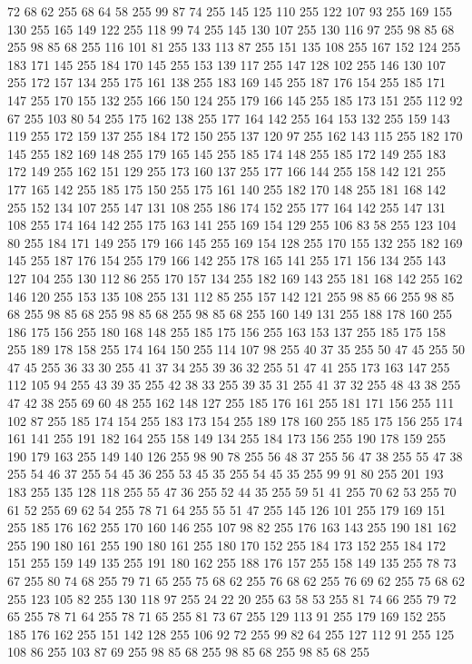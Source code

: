 72 68 62 255 68 64 58 255 99 87 74 255 145 125 110 255 122 107 93 255 169 155 130 255 165 149 122 255 118 99 74 255 145 130 107 255 130 116 97 255 98 85 68 255 98 85 68 255 116 101 81 255 133 113 87 255 151 135 108 255 167 152 124 255 183 171 145 255 184 170 145 255 153 139 117 255 147 128 102 255 146 130 107 255 172 157 134 255 175 161 138 255 183 169 145 255 187 176 154 255 185 171 147 255 170 155 132 255 166 150 124 255 179 166 145 255 185 173 151 255 112 92 67 255 103 80 54 255 175 162 138 255 177 164 142 255 164 153 132 255 159 143 119 255 172 159 137 255 184 172 150 255 137 120 97 255 162 143 115 255 182 170 145 255 182 169 148 255 179 165 145 255 185 174 148 255 185 172 149 255 183 172 149 255 162 151 129 255 173 160 137 255 177 166 144 255 158 142 121 255 177 165 142 255 185 175 150 255 175 161 140 255 182 170 148 255 181 168 142 255 152 134 107 255 147 131 108 255 186 174 152 255 177 164 142 255 147 131 108 255 174 164 142 255 175 163 141 255 169 154 129 255 106 83 58 255
123 104 80 255 184 171 149 255 179 166 145 255 169 154 128 255 170 155 132 255 182 169 145 255 187 176 154 255 179 166 142 255 178 165 141 255 171 156 134 255 143 127 104 255 130 112 86 255 170 157 134 255 182 169 143 255 181 168 142 255 162 146 120 255 153 135 108 255 131 112 85 255 157 142 121 255 98 85 66 255 98 85 68 255 98 85 68 255 98 85 68 255 98 85 68 255 160 149 131 255 188 178 160 255 186 175 156 255 180 168 148 255 185 175 156 255 163 153 137 255 185 175 158 255 189 178 158 255 174 164 150 255 114 107 98 255 40 37 35 255 50 47 45 255 50 47 45 255 36 33 30 255 41 37 34 255 39 36 32 255 51 47 41 255 173 163 147 255 112 105 94 255 43 39 35 255 42 38 33 255 39 35 31 255 41 37 32 255 48 43 38 255 47 42 38 255 69 60 48 255 162 148 127 255 185 176 161 255 181 171 156 255 111 102 87 255 185 174 154 255 183 173 154 255 189 178 160 255 185 175 156 255 174 161 141 255 191 182 164 255 158 149 134 255 184 173 156 255 190 178 159 255 190 179 163 255
149 140 126 255 98 90 78 255 56 48 37 255 56 47 38 255 55 47 38 255 54 46 37 255 54 45 36 255 53 45 35 255 54 45 35 255 99 91 80 255 201 193 183 255 135 128 118 255 55 47 36 255 52 44 35 255 59 51 41 255 70 62 53 255 70 61 52 255 69 62 54 255 78 71 64 255 55 51 47 255 145 126 101 255 179 169 151 255 185 176 162 255 170 160 146 255 107 98 82 255 176 163 143 255 190 181 162 255 190 180 161 255 190 180 161 255 180 170 152 255 184 173 152 255 184 172 151 255 159 149 135 255 191 180 162 255 188 176 157 255 158 149 135 255 78 73 67 255 80 74 68 255 79 71 65 255 75 68 62 255 76 68 62 255 76 69 62 255 75 68 62 255 123 105 82 255 130 118 97 255 24 22 20 255 63 58 53 255 81 74 66 255 79 72 65 255 78 71 64 255 78 71 65 255 81 73 67 255 129 113 91 255 179 169 152 255 185 176 162 255 151 142 128 255 106 92 72 255 99 82 64 255 127 112 91 255 125 108 86 255 103 87 69 255 98 85 68 255 98 85 68 255 98 85 68 255
